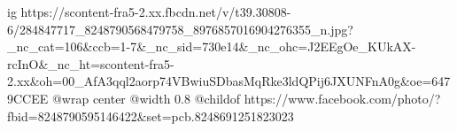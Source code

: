  
 
 
 
 

\ifcmt
  ig https://scontent-fra5-2.xx.fbcdn.net/v/t39.30808-6/284847717_8248790568479758_8976857016904276355_n.jpg?_nc_cat=106&ccb=1-7&_nc_sid=730e14&_nc_ohc=J2EEgOe_KUkAX-rcInO&_nc_ht=scontent-fra5-2.xx&oh=00_AfA3qql2aorp74VBwiuSDbasMqRke3ldQPij6JXUNFnA0g&oe=6479CCEE
  @wrap center
  @width 0.8
  @childof https://www.facebook.com/photo/?fbid=8248790595146422&set=pcb.8248691251823023
\fi
